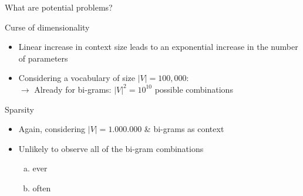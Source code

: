 
\begin{frame}{What are potential problems?}

\vfill

\begin{block}{Curse of dimensionality}
    \begin{itemize}
        \item Linear increase in context size leads to an exponential increase in the number of parameters
        \item Considering a vocabulary of size $|V| = 100,000$:\\
        $\rightarrow$ Already for bi-grams: $|V|^2 = 10^{10}$ possible combinations
    \end{itemize}
\end{block}
\begin{block}{Sparsity}
    \begin{itemize}
        \item Again, considering $|V| = 1.000.000$ \& bi-grams as context
        \item Unlikely to observe all of the bi-gram combinations
        \begin{enumerate}[(a)]
            \item ever
            \item often
        \end{enumerate}
    \end{itemize}
\end{block}

\vfill

\end{frame}


